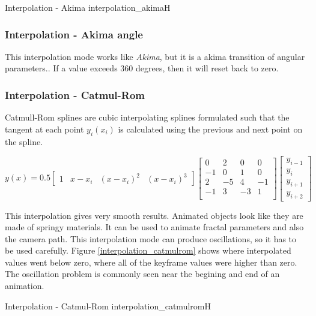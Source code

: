 {Interpolation - Akima}
{interpolation_akima}{H}

\subsubsection{Interpolation - Akima angle}\label{interpolation-akima-angle}

This interpolation mode works like \emph{Akima}, but it is a akima transition of angular
parameters.. If a value exceeds 360 degrees, then it will reset back to zero.

\subsubsection{Interpolation - Catmul-Rom}\label{interpolation-catmul-rom}

Catmull-Rom splines are cubic interpolating splines formulated such that the
tangent at each point $ y_i(x_i) $ is calculated using the previous and next
point on the spline.

\[ y(x) = 0.5 \begin{bmatrix} 1 & x-x_i & (x-x_i)^2 & (x-x_i)^3\end{bmatrix}
\begin{bmatrix} 0 & 2 & 0 & 0 \\ -1 & 0 & 1 & 0 \\ 2 & -5 & 4 & -1 \\ -1 & 3 &
-3 & 1 \\ \end{bmatrix} \begin{bmatrix} y_{i-1} \\ y_i \\ y_{i+1} \\ y_{i+2}
\end{bmatrix} \]

This interpolation gives very smooth results. Animated objects look like they are made
of springy materials. It can be used to animate fractal parameters and also the
camera path. This interpolation mode can produce oscillations, so it has to be used
carefully. Figure \ref{interpolation_catmulrom}
shows where interpolated values went below zero,  where all of the keyframe values were higher than zero. The oscillation problem is commonly seen near the begining and end of an animation.

{Interpolation - Catmul-Rom}
{interpolation_catmulrom}{H}

